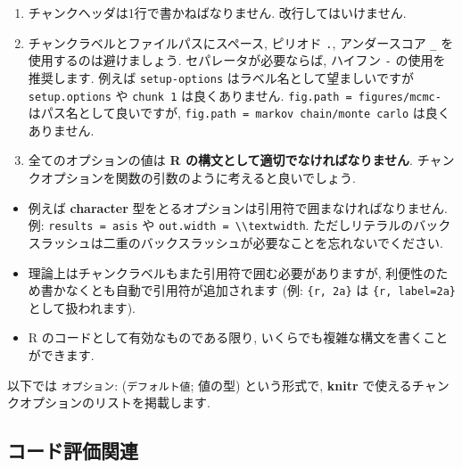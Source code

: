 \documentclass[
  11pt,
  lualatex,
  ja=standard]{bxjsreport}
\providecommand{\tightlist}{%
  \setlength{\itemsep}{0pt}\setlength{\parskip}{0pt}}
\begin{document}
\begin{enumerate}
\def\labelenumi{\arabic{enumi}.}
\tightlist
\item
  チャンクヘッダは1行で書かねばなりません. 改行してはいけません.
\item
  チャンクラベルとファイルパスにスペース, ピリオド \texttt{.}, アンダースコア \texttt{\_} を使用するのは避けましょう. セパレータが必要ならば, ハイフン \texttt{-} の使用を推奨します. 例えば \texttt{setup-options} はラベル名として望ましいですが \texttt{setup.options} や \texttt{chunk 1} は良くありません. \texttt{fig.path = \textquotesingle{}figures/mcmc-\textquotesingle{}} はパス名として良いですが, \texttt{fig.path = \textquotesingle{}markov\ chain/monte\ carlo\textquotesingle{}} は良くありません.
\item
  全てのオプションの値は \textbf{R の構文として適切でなければなりません}. チャンクオプションを関数の引数のように考えると良いでしょう.
\end{enumerate}

\begin{itemize}
\tightlist
\item
  例えば \textbf{character} 型をとるオプションは引用符で囲まなければなりません. 例: \texttt{results = \textquotesingle{}asis\textquotesingle{}} や \texttt{out.width = \textquotesingle{}\textbackslash{}\textbackslash{}textwidth\textquotesingle{}}. ただしリテラルのバックスラッシュは二重のバックスラッシュが必要なことを忘れないでください.
\item
  理論上はチャンクラベルもまた引用符で囲む必要がありますが, 利便性のため書かなくとも自動で引用符が追加されます (例: \texttt{\textasciigrave{}\textasciigrave{}\textasciigrave{}\{r,\ 2a\}\textasciigrave{}\textasciigrave{}\textasciigrave{}} は \texttt{\textasciigrave{}\textasciigrave{}\textasciigrave{}\{r,\ label=\textquotesingle{}2a\textquotesingle{}\}\textasciigrave{}\textasciigrave{}\textasciigrave{}} として扱われます).
\item
  R のコードとして有効なものである限り, いくらでも複雑な構文を書くことができます.
\end{itemize}

以下では \texttt{オプション}: (\texttt{デフォルト値}; 値の型) という形式で, \textbf{knitr} で使えるチャンクオプションのリストを掲載します.

\hypertarget{evaluate}{%
\subsection{コード評価関連}\label{evaluate}}
\end{document}
